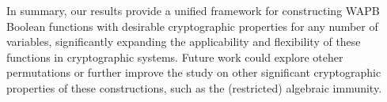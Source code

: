 \documentclass{llncs}
\begin{document}
In summary, our results provide a unified framework for constructing WAPB Boolean functions with desirable cryptographic properties for any number of variables, significantly expanding the applicability and flexibility of these functions in cryptographic systems. Future work could explore oteher permutations or further improve the study on other significant cryptographic properties of these constructions, such as the (restricted) algebraic immunity.






\ifnum{}
%


\else


\end{document}
